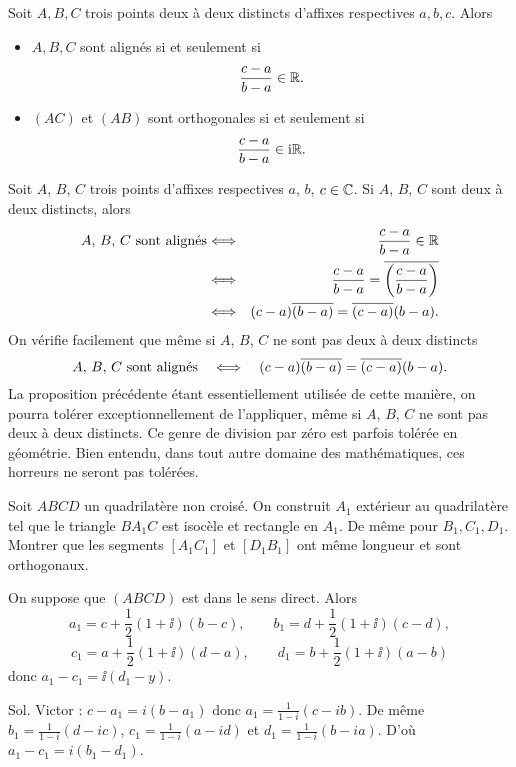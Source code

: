 \documentclass{magnolia}
\begin{document}
\begin{proposition}[utile=-3]
Soit $A,B,C$ trois points deux à deux distincts d'affixes respectives $a,b,c$. Alors
\begin{itemize}
\item $A,B,C$ sont alignés si et seulement si
  \[\frac{c-a}{b-a}\in\mathbb{R}.\]
\item $(AC)$ et $(AB)$ sont orthogonales si et seulement si
  \[\frac{c-a}{b-a}\in{\rm i}\mathbb{R}.\]
\end{itemize}
\end{proposition}

\begin{remarques}
\remarque Soit $A$, $B$, $C$ trois points d'affixes respectives $a$, $b$, $c\in\mathbb{C}$. Si $A$, $B$, $C$ sont deux à deux distincts, alors
  \begin{eqnarray*}
  \text{$A$, $B$, $C$ sont alignés}
  &\Longleftrightarrow& \frac{c-a}{b-a}\in\mathbb{R}\\
  &\Longleftrightarrow& \frac{c-a}{b-a}=\overline{\left(\frac{c-a}{b-a}\right)}\\
  &\Longleftrightarrow& (c-a)\overline{(b-a)}=\overline{(c-a)}(b-a).
  \end{eqnarray*}
  On vérifie facilement que même si $A$, $B$, $C$ ne sont pas deux à deux distincts
  \[\text{$A$, $B$, $C$ sont alignés} \quad\Longleftrightarrow\quad (c-a)\overline{(b-a)}=\overline{(c-a)}(b-a).\]
\remarque La proposition précédente étant essentiellement utilisée de cette manière, on pourra tolérer exceptionnellement de l'appliquer, même si $A$, $B$, $C$ ne sont pas deux à deux distincts. Ce genre de \og division par zéro \fg est parfois tolérée en géométrie. Bien entendu, dans tout autre domaine des mathématiques, ces horreurs ne seront pas tolérées.
\end{remarques}

\begin{exoUnique}
\exo Soit $ABCD$ un quadrilatère non croisé. On construit $A_1$ extérieur
au quadrilatère tel que le triangle $BA_1C$ est isocèle et
rectangle en $A_1$. De même pour $B_1,C_1,D_1$. Montrer que les
segments $[A_1C_1]$ et $[D_1B_1]$ ont même longueur et sont
orthogonaux.
\begin{sol}
On suppose que $(ABCD)$ est dans le sens direct. Alors
\[a_1=c+\frac{1}{2}(1+\ii)(b-c), \qquad
  b_1=d+\frac{1}{2}(1+\ii)(c-d),\]
\[c_1=a+\frac{1}{2}(1+\ii)(d-a), \qquad
  d_1=b+\frac{1}{2}(1+\ii)(a-b)\]
donc $a_1-c_1=\ii(d_1-y)$.

Sol. Victor :
$c-a_1=i(b-a_1)$ donc $a_1=\frac{1}{1-i}(c-ib)$. De même $b_1=\frac{1}{1-i}(d-ic)$, $c_1=\frac{1}{1-i}(a-id)$ et $d_1=\frac{1}{1-i}(b-ia)$. D'où $a_1-c_1=i(b_1-d_1)$.
\end{sol}
\end{exoUnique}
\end{document}
